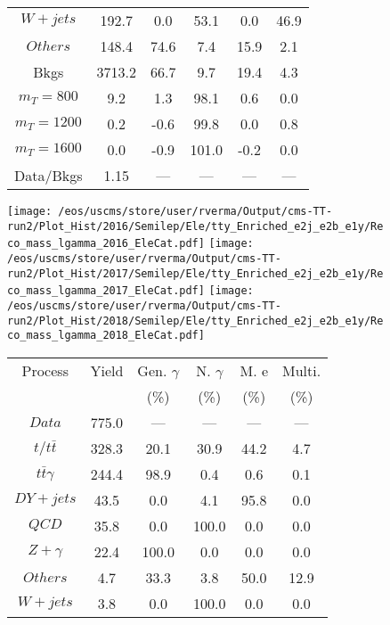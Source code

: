 \begin{figure}
\begin{minipage}[c]{0.32\textwidth}
{\begin{tabular}{cccccc}
$ W+jets $ &  192.7 &  0.0 &  53.1 &  0.0 &  46.9\\
$ Others $ &  148.4 &  74.6 &  7.4 &  15.9 &  2.1\\
Bkgs &  3713.2 &  66.7 &  9.7 &  19.4 &  4.3\\
$ m_{T} = 800 $ &  9.2 &  1.3 &  98.1 &  0.6 &  0.0\\
$ m_{T} = 1200 $ &  0.2 &  -0.6 &  99.8 &  0.0 &  0.8\\
$ m_{T} = 1600 $ &  0.0 &  -0.9 &  101.0 &  -0.2 &  0.0\\
Data/Bkgs &  1.15 &  --- &  --- &  --- &  ---\\
\hline
\end{tabular}
}
\end{minipage}
\end{figure}

\begin{figure}
\centering
\texttt{[image: /eos/uscms/store/user/rverma/Output/cms-TT-run2/Plot\_Hist/2016/Semilep/Ele/tty\_Enriched\_e2j\_e2b\_e1y/Reco\_mass\_lgamma\_2016\_EleCat.pdf]}
\texttt{[image: /eos/uscms/store/user/rverma/Output/cms-TT-run2/Plot\_Hist/2017/Semilep/Ele/tty\_Enriched\_e2j\_e2b\_e1y/Reco\_mass\_lgamma\_2017\_EleCat.pdf]}
\texttt{[image: /eos/uscms/store/user/rverma/Output/cms-TT-run2/Plot\_Hist/2018/Semilep/Ele/tty\_Enriched\_e2j\_e2b\_e1y/Reco\_mass\_lgamma\_2018\_EleCat.pdf]}
\begin{minipage}[c]{0.32\textwidth}
\centering
\tiny{
\begin{tabular}{cccccc}
\hline
Process & Yield & Gen. $\gamma$ & N. $\gamma$ & M. e & Multi. \\
 &  & (\%) & (\%) & (\%) & (\%)  \\
\hline
                                                                      $ Data $ &  775.0 &  --- &  --- &  --- &  ---\\
$ t/t\bar{t} $ &  328.3 &  20.1 &  30.9 &  44.2 &  4.7\\
$ t\bar{t}\gamma $ &  244.4 &  98.9 &  0.4 &  0.6 &  0.1\\
$ DY+jets $ &  43.5 &  0.0 &  4.1 &  95.8 &  0.0\\
$ QCD $ &  35.8 &  0.0 &  100.0 &  0.0 &  0.0\\
$ Z+\gamma $ &  22.4 &  100.0 &  0.0 &  0.0 &  0.0\\
$ Others $ &  4.7 &  33.3 &  3.8 &  50.0 &  12.9\\
$ W+jets $ &  3.8 &  0.0 &  100.0 &  0.0 &  0.0\\

\end{tabular}}
\end{minipage}
\end{figure}
